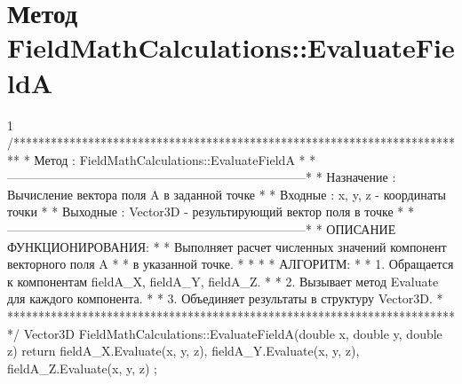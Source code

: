\section{Метод FieldMathCalculations::EvaluateFieldA}
\footnotesize
\begin{listing}{1}
/*************************************************************************
* Метод         : FieldMathCalculations::EvaluateFieldA                  *
*------------------------------------------------------------------------*
* Назначение    : Вычисление вектора поля A в заданной точке             *
* Входные       : x, y, z - координаты точки                             *
* Выходные      : Vector3D - результирующий вектор поля в точке          *
*------------------------------------------------------------------------*
* ОПИСАНИЕ ФУНКЦИОНИРОВАНИЯ:                                             *
* Выполняет расчет численных значений компонент векторного поля A        *
* в указанной точке.                                                     *
* *
* АЛГОРИТМ:                                                              *
* 1. Обращается к компонентам fieldA_X, fieldA_Y, fieldA_Z.              *
* 2. Вызывает метод Evaluate для каждого компонента.                     *
* 3. Объединяет результаты в структуру Vector3D.                         *
*************************************************************************/
Vector3D FieldMathCalculations::EvaluateFieldA(double x, double y, double z) {
    return { fieldA_X.Evaluate(x, y, z), 
             fieldA_Y.Evaluate(x, y, z), 
             fieldA_Z.Evaluate(x, y, z) };
}
\end{listing}
\normalsize

\pagebreak

